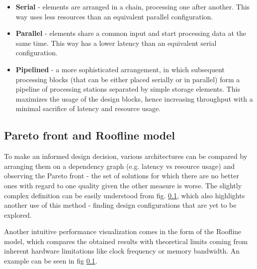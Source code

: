 \begin{itemize}
  \item \textbf{Serial} - elements are arranged in a chain, processing one after another. This way uses less resources than an equivalent parallel configuration.
  \item \textbf{Parallel} - elements share a common input and start processing data at the same time. This way has a lower latency than an equivalent serial configuration.
  \item \textbf{Pipelined} - a more sophisticated arrangement, in which subsequent processing blocks (that can be either placed serially or in parallel) form a pipeline of processing stations separated by simple storage elements. This maximizes the usage of the design blocks, hence increasing throughput with a minimal sacrifice of latency and resource usage.
\end{itemize}



\subsection{Pareto front and Roofline model}
To make an informed design decision, various architectures can be compared by arranging them on a dependency graph (e.g. latency vs resource usage) and observing the Pareto front - the set of solutions for which there are no better ones with regard to one quality given the other measure is worse. The slightly complex definition can be easily understood from fig. \ref{}, which also highlights another use of this method - finding design configurations that are yet to be explored.


Another intuitive performance visualization comes in the form of the Roofline model, which compares the obtained results with theoretical limits coming from inherent hardware limitations like clock frequency or memory bandwidth. An example can be seen in fig \ref{}.




